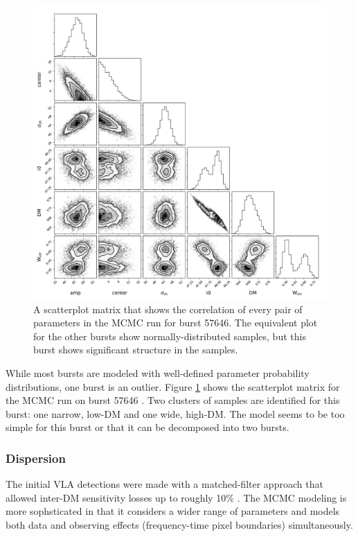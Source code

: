 \documentclass[twocolumn]{aastex61}
\begin{document}
\begin{figure}[htb]
\begin{center}
\includegraphics[width=\columnwidth]{corner57646}
\caption{A scatterplot matrix that shows the correlation of every pair of parameters in the MCMC run for burst 57646. The equivalent plot for the other bursts show normally-distributed samples, but this burst shows significant structure in the samples.
\label{fig:corner}}
\end{center}
\end{figure}

While most bursts are modeled with well-defined parameter probability distributions, one burst is an outlier. Figure \ref{fig:corner} shows the scatterplot matrix for the MCMC run on burst 57646 \citep{corner}. Two clusters of samples are identified for this burst: one narrow, low-DM and one wide, high-DM. The model seems to be too simple for this burst or that it can be decomposed into two bursts.

\subsubsection{Dispersion}

The initial VLA detections were made with a matched-filter approach that allowed inter-DM sensitivity losses up to roughly 10\% \citep[$\Delta \rm{DM}=10\ \rm{pc}\ \rm{cm}^{-3}$][]{2003ApJ...596.1142C}. 
The MCMC modeling is more sophsticated in that it considers a wider range of parameters and models both data and observing effects (frequency-time pixel boundaries) simultaneously.
\end{document}
